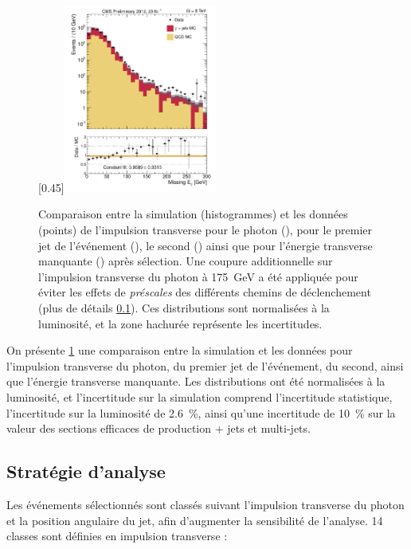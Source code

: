\begin{figure}[p]
    \subcaptionbox{\label{met}}[0.45\textwidth]{\includegraphics[width=0.45\textwidth]{chapitre4/figs/MET_passedID_log.pdf}}
    \caption{Comparaison entre la simulation (histogrammes) et les données (points) de l'impulsion transverse pour le photon (), pour le premier jet de l'événement (), le second () ainsi que pour l'énergie transverse manquante () après sélection. Une coupure additionnelle sur l'impulsion transverse du photon à \SI{175}{\GeV} a été appliquée pour éviter les effets de \emph{préscales} des différents chemins de déclenchement (plus de détails \cref{sec:jetmet_strategy}). Ces distributions sont normalisées à la luminosité, et la zone hachurée représente les incertitudes.}
    \label{fig:pt_photon_jet}
\end{figure}

\bigskip

On présente \cref{fig:pt_photon_jet} une comparaison entre la simulation et les données pour l'impulsion transverse du photon, du premier jet de l'événement, du second, ainsi que l'énergie transverse manquante. Les distributions ont été normalisées à la luminosité, et l'incertitude sur la simulation comprend l'incertitude statistique, l'incertitude sur la luminosité de \SI{2.6}{\%}, ainsi qu'une incertitude de \SI{10}{\%} sur la valeur des sections efficaces de production \Pphoton + jets et multi-jets.


\subsection{Stratégie d'analyse} \label{sec:jetmet_strategy}

Les événements sélectionnés sont classés suivant l'impulsion transverse du photon et la position angulaire du jet, afin d'augmenter la sensibilité de l'analyse. 14 classes sont définies en impulsion transverse :

